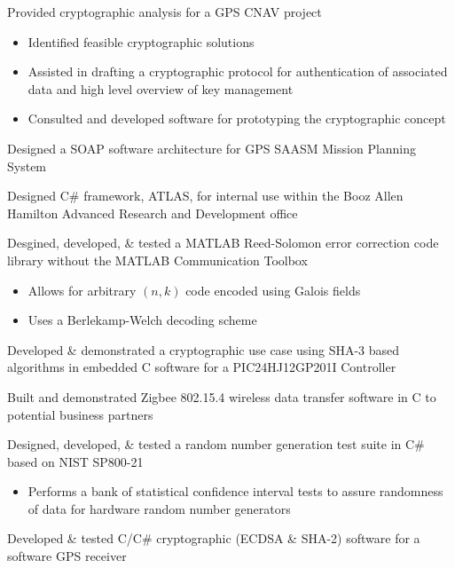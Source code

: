 \documentclass[letterpaper]{clinton-resume}
\begin{document}
\begin{minipage}[t]{0.66\textwidth}

\begin{tightitemize}
\item Provided cryptographic analysis for a GPS CNAV project
	\begin{itemize}
	\item Identified feasible cryptographic solutions
	\item Assisted in drafting a cryptographic protocol for authentication of associated data and high level overview of key management
	\item Consulted and developed software for prototyping the cryptographic concept
	\end{itemize}
\item Designed a SOAP software architecture for GPS SAASM Mission Planning System
\item Designed C\# framework, ATLAS, for internal use within the Booz Allen Hamilton Advanced Research and Development office
\item Desgined, developed, \& tested a MATLAB Reed-Solomon error correction code library without the MATLAB Communication Toolbox
	\begin{itemize}
	\item Allows for arbitrary $(n,k)$ code encoded using Galois fields
	\item Uses a Berlekamp-Welch decoding scheme
	\end{itemize}
\item Developed \& demonstrated a cryptographic use case using SHA-3 based algorithms in embedded C software for a PIC24HJ12GP201I Controller
\item Built and demonstrated Zigbee 802.15.4 wireless data transfer software in C to potential business partners
\item Designed, developed, \& tested a random number generation test suite in C\# based on NIST SP800-21
	\begin{itemize}
	\item Performs a bank of statistical confidence interval tests to assure randomness of data for hardware random number generators
	\end{itemize}
\item Developed \& tested C/C\# cryptographic (ECDSA \& SHA-2) software for a software GPS receiver 
\begin{itemize}

\end{itemize}
\end{tightitemize}
\end{minipage}
\end{document}
